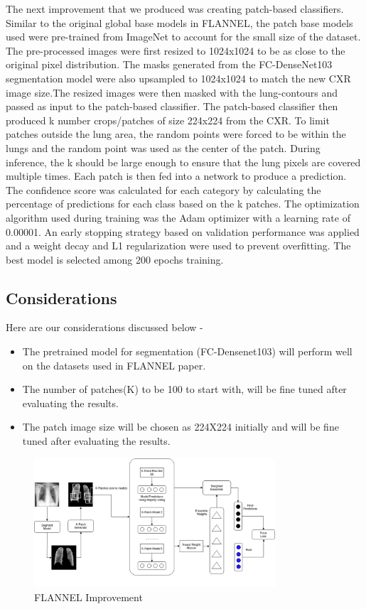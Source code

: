 \documentclass{sigkddExp}
\begin{document}
The next improvement that we produced was creating patch-based classifiers.
Similar to the original global base models in FLANNEL, the patch base models
used were pre-trained from ImageNet to account for the small size of the
dataset. The pre-processed images were first resized to 1024x1024 to be as close
to the original pixel distribution. The masks generated from the FC-DenseNet103
segmentation model were also upsampled to 1024x1024 to match the new CXR image
size.The resized images were then masked with the lung-contours and passed as
input to the patch-based classifier. The patch-based classifier then produced k
number crops/patches of size 224x224 from the CXR. To limit patches outside the
lung area, the random points were forced to be within the lungs and the random
point was used as the center of the patch. During inference, the k should be
large enough to ensure that the lung pixels are covered multiple times. Each
patch is then fed into a network to produce a prediction. The confidence score
was calculated for each category by calculating the percentage of predictions
for each class based on the k patches. The optimization algorithm used during
training was the Adam optimizer with a learning rate of 0.00001. An early
stopping strategy based on validation performance was applied and a weight decay
and L1 regularization were used to prevent overfitting. The best model is
selected among 200 epochs training.

\subsection{Considerations}
Here are our considerations discussed below -
\begin{itemize}
    \item The pretrained model for segmentation (FC-Densenet103) will perform
          well on the datasets used in FLANNEL \cite{10.1093/jamia/ocaa280} paper.
    \item The number of patches(K) to be 100 to start with, will be fine tuned
          after evaluating the results.
    \item The patch image size will be chosen as 224X224 initially and will be
          fine tuned after evaluating the results.
\end{itemize}


\begin{figure}[h]
    \includegraphics[width=0.8\textwidth]{../doc/images/FLANNEL-IMPROVED.png}
    \caption{FLANNEL Improvement}
    \label{fig:improve}
\end{figure}
\end{document}
